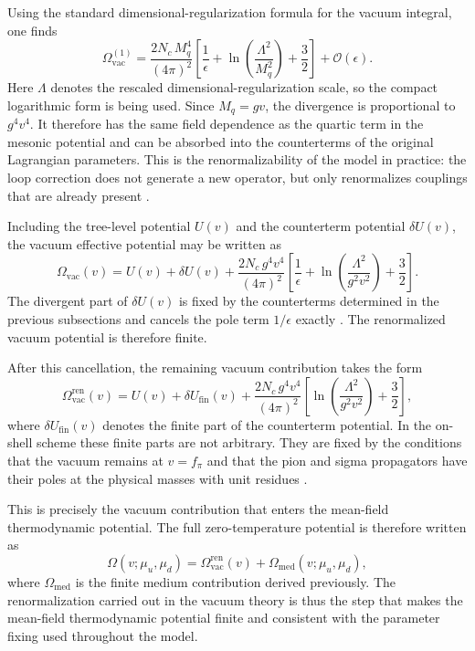 Using the standard dimensional-regularization formula for the vacuum
integral, one finds
\begin{equation}
\Omega_{\mathrm{vac}}^{(1)}
=
\frac{2N_c\,M_q^4}{(4\pi)^2}
\left[
\frac{1}{\epsilon}
+
\ln\!\left(\frac{\Lambda^2}{M_q^2}\right)
+
\frac{3}{2}
\right]
+\mathcal{O}(\epsilon) .
\label{eq:qm_Omega_vac_div}
\end{equation}
Here \(\Lambda\) denotes the rescaled dimensional-regularization
scale, so the compact logarithmic form is being used.
Since \(M_q=gv\), the divergence is proportional to \(g^4v^4\). It
therefore has the same field dependence as the quartic term in the
mesonic potential and can be absorbed into the counterterms of the
original Lagrangian parameters. This is the renormalizability of the
model in practice: the loop correction does not generate a new
operator, but only renormalizes couplings that are already present
\cite{PeskinSchroeder1995,WeinbergQFT}.

Including the tree-level potential \(U(v)\) and the counterterm
potential \(\delta U(v)\), the vacuum effective potential may be
written as
\begin{equation}
\Omega_{\mathrm{vac}}(v)
=
U(v)
+
\delta U(v)
+
\frac{2N_c\,g^4v^4}{(4\pi)^2}
\left[
\frac{1}{\epsilon}
+
\ln\!\left(\frac{\Lambda^2}{g^2v^2}\right)
+
\frac{3}{2}
\right] .
\label{eq:qm_Omega_vac_with_ct}
\end{equation}
The divergent part of \(\delta U(v)\) is fixed by the counterterms
determined in the previous subsections and cancels the pole term
\(1/\epsilon\) exactly \cite{Folkestad2018}. The renormalized vacuum
potential is therefore finite.

After this cancellation, the remaining vacuum contribution takes the
form
\begin{equation}
\Omega_{\mathrm{vac}}^{\mathrm{ren}}(v)
=
U(v)
+
\delta U_{\mathrm{fin}}(v)
+
\frac{2N_c\,g^4v^4}{(4\pi)^2}
\left[
\ln\!\left(\frac{\Lambda^2}{g^2v^2}\right)
+
\frac{3}{2}
\right],
\label{eq:qm_Omega_vac_ren_generic}
\end{equation}
where \(\delta U_{\mathrm{fin}}(v)\) denotes the finite part of the
counterterm potential. In the on-shell scheme these finite parts are
not arbitrary. They are fixed by the conditions that the vacuum
remains at \(v=f_\pi\) and that the pion and sigma propagators have
their poles at the physical masses with unit residues
\cite{Folkestad2018,Andersen2024}.

This is precisely the vacuum contribution that enters the mean-field
thermodynamic potential. The full zero-temperature potential is
therefore written as
\begin{equation}
\Omega(v;\mu_u,\mu_d)
=
\Omega_{\mathrm{vac}}^{\mathrm{ren}}(v)
+
\Omega_{\mathrm{med}}(v;\mu_u,\mu_d),
\label{eq:qm_full_potential_final}
\end{equation}
where \(\Omega_{\mathrm{med}}\) is the finite medium contribution
derived previously. The renormalization carried out in the vacuum
theory is thus the step that makes the mean-field thermodynamic
potential finite and consistent with the parameter fixing used
throughout the model.

